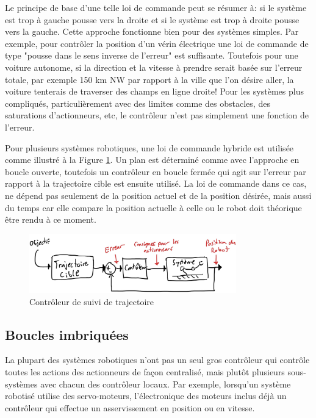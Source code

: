 Le principe de base d'une telle loi de commande peut se résumer à: si le système est trop à gauche pousse vers la droite et si le système est trop à droite pousse vers la gauche. Cette approche fonctionne bien pour des systèmes simples. Par exemple, pour contrôler la position d'un vérin électrique une loi de commande de type "pousse dans le sens inverse de l'erreur" est suffisante. Toutefois pour une voiture autonome, si la direction et la vitesse à prendre serait basée sur l'erreur totale, par exemple 150 km NW par rapport à la ville que l'on désire aller, la voiture tenterais de traverser des champs en ligne droite! Pour les systèmes plus compliqués, particulièrement avec des limites comme des obstacles, des saturations d'actionneurs, etc, le contrôleur n'est pas simplement une fonction de l'erreur.

Pour plusieurs systèmes robotiques, une loi de commande hybride est utilisée comme illustré à la Figure \ref{fig:trajectoryfollowingcontroller}. Un plan est déterminé comme avec l'approche en boucle ouverte, toutefois un contrôleur en boucle fermée qui agit sur l'erreur par rapport à la trajectoire cible est ensuite utilisé. La loi de commande dans ce cas, ne dépend pas seulement de la position actuel et de la position désirée, mais aussi du temps car elle compare la position actuelle à celle ou le robot doit théorique être rendu à ce moment. 
\begin{figure}[htbp]
	\centering
		\includegraphics[width=0.8\textwidth]{fig/trajectoryfollowingcontroller.jpg}
	\caption{Contrôleur de suivi de trajectoire}
	\label{fig:trajectoryfollowingcontroller}
\end{figure}



\subsection{Boucles imbriquées}

La plupart des systèmes robotiques n'ont pas un seul gros contrôleur qui contrôle toutes les actions des actionneurs de façon centralisé, mais plutôt plusieurs sous-systèmes avec chacun des contrôleur locaux. Par exemple, lorsqu'un système robotisé utilise des servo-moteurs, l'électronique des moteurs inclus déjà un contrôleur qui effectue un asservissement en position ou en vitesse. 

